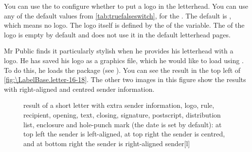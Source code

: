 \begin{Declaration}
\end{Declaration}
%
%
You can use the  to configure whether to put a
logo in the letterhead. You can use any of the default values from
\autoref{tab:truefalseswitch},  for the
. The default is , which means no logo. The
logo itself is defined by the  of the 
variable. The  of the logo is empty by default and
\KOMAScript{} does not use it in the default letterhead pages.%
\begin{Example}
  Mr Public finds it particularly stylish when he provides his letterhead with
  a logo. He has saved his logo as a graphics file, which he would like to
  load using . To do this, he loads the
   package (see
  \cite{package:graphics}).%
  You can see the result in the top left of
  \autoref{fig:\LabelBase.letter-16-18}. The other two images in this figure
  show the results with right-aligned and centred sender information.
  \begin{figure}
    \setcapindent{0pt}%
    {\hfill
      \quad
      \par\bigskip}
    \begin{captionbeside}
      {result of a short letter with extra sender information, logo, rule,
        recipient, opening, text, closing, signature, postscript, distribution
        list, enclosure and hole-punch mark (the date is set by default):
        at top left the sender is left-aligned, at top right the sender is
        centred, and at bottom right the sender is right-aligned
        sender}[l]
      \quad
    \end{captionbeside}
  \label{fig:\LabelBase.letter-16-18}
  \end{figure}
\end{Example}%
%
\EndIndexGroup



